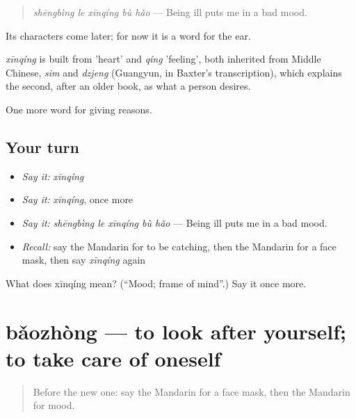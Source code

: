 \begin{quote}
\emph{shēngbìng le xīnqíng bù hǎo} — Being ill puts me in a bad mood.
\end{quote}

Its characters come later; for now it is a word for the ear.

\begin{cousinweb}
\emph{xīnqíng} is built from  'heart' and \emph{qíng} 'feeling', both inherited from Middle Chinese, \emph{sim} and \emph{dzjeng} (Guangyun, in Baxter's transcription), which explains the second, after an older book, as what a person desires.
\end{cousinweb}

\begin{grammarlens}[title={What you've built}]
One more word for giving reasons.
\end{grammarlens}

\subsection*{Your turn}
\begin{itemize}
\raggedright
  \item \emph{Say it:} \emph{xīnqíng}
  \item \emph{Say it:} \emph{xīnqíng}, once more
  \item \emph{Say it:} \emph{shēngbìng le xīnqíng bù hǎo} — Being ill puts me in a bad mood.
  \item \emph{Recall:} say the Mandarin for to be catching, then the Mandarin for a face mask, then say \emph{xīnqíng} again
\end{itemize}

\begin{tcolorbox}[breakable,colback=teal!4,colframe=teal!35!black,title={Before you move on}]
What does xīnqíng mean? (\textquotedblleft{}Mood; frame of mind\textquotedblright{}.) Say it once more.
\end{tcolorbox}
\section[bǎozhòng]{bǎozhòng — to look after yourself; to take care of oneself}

\label{lesson:ZH-C245-baozhong}



\begin{quote}
Before the new one: say the Mandarin for a face mask, then the Mandarin for mood.
\end{quote}

